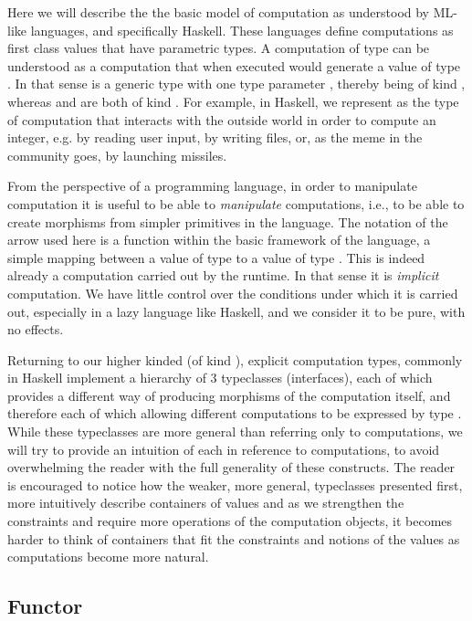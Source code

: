 Here we will describe the the basic model of computation as understood
by ML-like languages, and specifically Haskell. These languages define
computations as first class values that have parametric types. A
computation of type  can be understood as a computation that
when executed would generate a value of type . In that sense
 is a generic type with one type parameter , thereby
being of kind \hask{* -> *}, whereas  and  are both
of kind \hask{*}. For example, in Haskell, we represent as  the type of computation that interacts with the outside world
in order to compute an integer, e.g. by reading user input, by writing
files, or, as the meme in the community goes, by launching missiles.

From the perspective of a programming language, in order to manipulate
computation it is useful to be able to \emph{manipulate} computations, i.e., to
be able to create morphisms  from simpler primitives
in the language. The notation of the arrow \hask{->} used here is a
function within the basic framework of the language, a simple mapping
between a value of type  to a value of type . This
is indeed already a computation carried out by the runtime.  In that
sense it is \emph{implicit} computation. We have little control over
the conditions under which it is carried out, especially in a lazy
language like Haskell, and we consider it to be pure, with no
effects. 

Returning to our higher kinded (of kind \hask{* -> *}), explicit
computation types, commonly in Haskell implement a hierarchy of 3 typeclasses
(interfaces), each
of which provides a different way of producing morphisms of the
computation itself, and therefore each of which allowing different
computations to be expressed by type . While these typeclasses are
more general than referring only to computations, we will try to
provide an intuition of each in reference to computations, to
avoid overwhelming the reader with the full generality of these
constructs. The reader is encouraged to notice how the weaker, more
general, typeclasses presented first, more intuitively describe
containers of values and as we strengthen the constraints and require
more operations of the computation objects, it becomes harder to think of
containers that fit the constraints and notions of the values as
computations become more natural.

\subsection{Functor}

